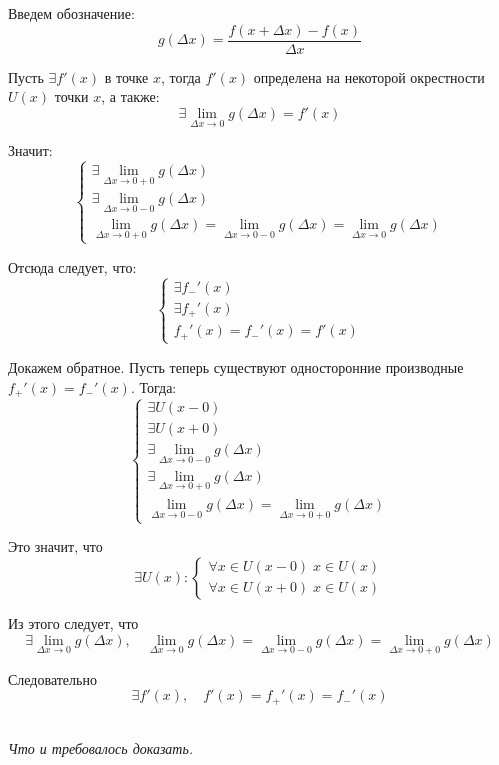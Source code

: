 \documentclass[a4paper,12pt,oneside]{extbook}
\newcommand{\newpar}{$ $\par\nobreak\ignorespaces}
\theoremstyle{numbered}
\theoremstyle{unnumbered}
\theoremstyle{named}
\theoremstyle{unnumbered}
\theoremstyle{named}
\theoremstyle{named}
\theoremstyle{named}
\renewenvironment{proof}[1][]{\breakenv[Доказательство]{\if\relax\detokenize{#1}\relax\else\;\fi}{\textbf{#1}}}{\smallskip\newpar \hfill\textit{Что и требовалось доказать.}}
\begin{document}
\begin{proof}
    Введем обозначение:
    \[
        g(\Delta x) = \frac{f(x + \Delta x) - f(x)}{\Delta x}
    \]

    Пусть \(\exists f'(x)\) в точке \(x\), тогда \(f'(x)\) определена на некоторой окрестности \(U(x)\) точки \(x\), а также:
    \[
        \exists \lim_{\Delta x \to 0}{g(\Delta x)} = f'(x)
    \]

    Значит:
    \[
        \begin{cases}
            \displaystyle \exists \lim_{\Delta x \to 0 + 0}{g(\Delta x)} \\
            \displaystyle \exists \lim_{\Delta x \to 0 - 0}{g(\Delta x)} \\
            \displaystyle \lim_{\Delta x \to 0 + 0}{g(\Delta x)} = \lim_{\Delta x \to 0 - 0}{g(\Delta x)} = \lim_{\Delta x \to 0}{g(\Delta x)}
        \end{cases}
    \]

    Отсюда следует, что:
    \[
        \begin{cases}
            \exists f_-'(x) \\
            \exists f_+'(x) \\
            f_+'(x) = f_-'(x) = f'(x)
        \end{cases}
    \]

    Докажем обратное. Пусть теперь существуют односторонние производные \(f_+'(x) = f_-'(x)\). Тогда:
    \[
        \begin{cases}
            \exists U(x - 0)                                             \\
            \exists U(x + 0)                                             \\
            \exists \displaystyle \lim_{\Delta x \to 0 - 0}{g(\Delta x)} \\
            \exists \displaystyle \lim_{\Delta x \to 0 + 0}{g(\Delta x)} \\
            \displaystyle \lim_{\Delta x \to 0 - 0}{g(\Delta x)} = \lim_{\Delta x \to 0 + 0}{g(\Delta x)}
        \end{cases}
    \]

    Это значит, что
    \[
        \exists U(x):
        \begin{cases}
            \forall x \in U(x - 0) \; x \in U(x) \\
            \forall x \in U(x + 0) \; x \in U(x)
        \end{cases}
    \]

    Из этого следует, что
    \[
        \exists \lim_{\Delta x \to 0}{g(\Delta x)}, \quad \lim_{\Delta x \to 0}{g(\Delta x)} = \lim_{\Delta x \to 0 - 0}{g(\Delta x)} = \lim_{\Delta x \to 0 + 0}{g(\Delta x)}
    \]

    Следовательно
    \[
        \exists f'(x), \quad f'(x) = f_+'(x) = f_-'(x)
    \]
\end{proof}
\end{document}
